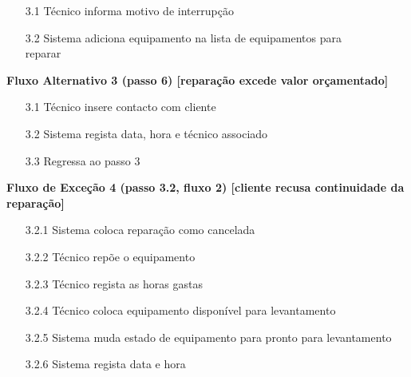 \documentclass[../relatorio.tex]{subfiles}
\begin{document}
\begin{itemize}
          \begin{itemize}
              \item[3.1]{Técnico informa motivo de interrupção}
              \item[3.2]{Sistema adiciona equipamento na lista de equipamentos para \\
              reparar}
          \end{itemize}
          \begin{flushleft}
              \textbf{Fluxo Alternativo 3 (passo 6) [reparação excede valor orçamentado]}
          \end{flushleft}
          \begin{itemize}
              \item[3.1]{Técnico insere contacto com cliente}
              \item[3.2]{Sistema regista data, hora e técnico associado}
              \item[3.3]{Regressa ao passo 3}
          \end{itemize}
          \begin{flushleft}
              \textbf{Fluxo de Exceção 4 (passo 3.2, fluxo 2) [cliente recusa continuidade da reparação]}
          \end{flushleft}
          \begin{itemize}
              \item[3.2.1]{Sistema coloca reparação como cancelada}
              \item[3.2.2]{Técnico repõe o equipamento}
              \item[3.2.3]{Técnico regista as horas gastas}
              \item[3.2.4]{Técnico coloca equipamento disponível para levantamento}
              \item[3.2.5]{Sistema muda estado de equipamento para pronto para levantamento}
              \item[3.2.6]{Sistema regista data e hora} 
          \end{itemize}
\end{itemize}
\end{document}
